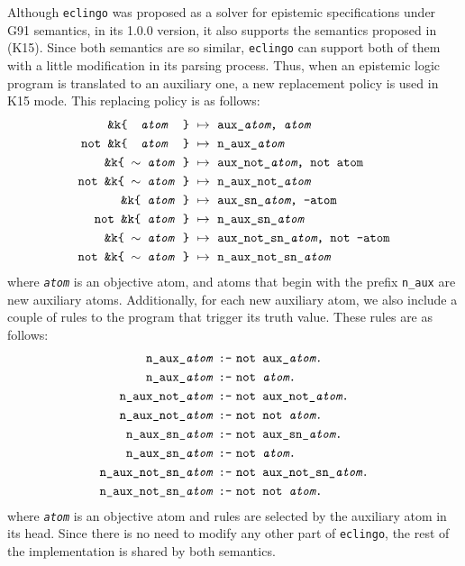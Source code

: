 \documentclass{new_tlp}
\let\sneg\relax
\newcommand{\sneg}{\ensuremath{\text{-}}}
\def\eclingo{{\tt eclingo}}
\begin{document}
Although \eclingo{} was proposed as a solver for epistemic specifications under G91 semantics, in its 1.0.0 version, it also supports
the semantics proposed in~\cite{kawabagezh15} (K15).
%
Since both semantics are so similar, \eclingo{} can support both of them with a little modification in its parsing process. Thus, when an epistemic logic program is translated to an auxiliary one, a new replacement policy is used in K15 mode. This replacing policy is as follows:
\begin{align*}
    \texttt{\&k\{ \ \emph{atom} \ \}} \ & \mapsto\ \texttt{aux\_\emph{atom},\ \emph{atom}} \\
    \texttt{not\ \&k\{ \ \emph{atom} \ \}} \ & \mapsto\ \texttt{n\_aux\_\emph{atom}}\\
    \texttt{\&k\{\ $\sim$ \emph{atom}\  \}}\ & \mapsto\ \texttt{aux\_not\_\emph{atom},\ not\ atom} \\
    \texttt{not\ \&k\{\ $\sim$ \emph{atom}\  \}}\ & \mapsto\ \texttt{n\_aux\_not\_\emph{atom}} \\
    \texttt{\&k\{\ \sneg\emph{atom}\  \}}\ & \mapsto\ \texttt{aux\_sn\_\emph{atom},\ -atom} \\
    \texttt{not\ \&k\{\ \sneg\emph{atom}\  \}}\ & \mapsto\ \texttt{n\_aux\_sn\_\emph{atom}} \\
    \texttt{\&k\{\ $\sim$ \sneg\emph{atom}\  \}}\ & \mapsto\ \texttt{aux\_not\_sn\_\emph{atom},\ not\ -atom} \\
    \texttt{not\ \&k\{\ $\sim$ \sneg\emph{atom}\  \}}\ & \mapsto\ \texttt{n\_aux\_not\_sn\_\emph{atom}}
\end{align*}
where \texttt{\emph{atom}} is an objective atom, and atoms that begin with the prefix \texttt{n\_aux} are new auxiliary atoms.
%
Additionally, for each new auxiliary atom, we also include a couple of rules to the program that trigger its truth value.
These rules are as follows:
\begin{align*}
    \texttt{n\_aux\_\emph{atom}}  &\text{ \texttt{:-} } \texttt{not\ aux\_\emph{atom}.} \\
    \texttt{n\_aux\_\emph{atom}}  &\text{ \texttt{:-} } \texttt{not\ \emph{atom}.} \\
    \texttt{n\_aux\_not\_\emph{atom}}  &\text{ \texttt{:-} } \texttt{not\ aux\_not\_\emph{atom}.} \\
    \texttt{n\_aux\_not\_\emph{atom}}  &\text{ \texttt{:-} } \texttt{not\ not\ \emph{atom}.} \\
    \texttt{n\_aux\_sn\_\emph{atom}}  &\text{ \texttt{:-} } \texttt{not\ aux\_sn\_\emph{atom}.} \\
    \texttt{n\_aux\_sn\_\emph{atom}}  &\text{ \texttt{:-} } \texttt{not\ \sneg\emph{atom}.} \\
    \texttt{n\_aux\_not\_sn\_\emph{atom}}  &\text{ \texttt{:-} } \texttt{not\ aux\_not\_sn\_\emph{atom}.} \\
    \texttt{n\_aux\_not\_sn\_\emph{atom}}  &\text{ \texttt{:-} } \texttt{not\ not\ \sneg\emph{atom}.}
\end{align*}
where \texttt{\emph{atom}} is an objective atom and rules are selected by the auxiliary atom in its head.
%
Since there is no need to modify any other part of \eclingo{}, the rest of the implementation is shared by both semantics.
\end{document}
